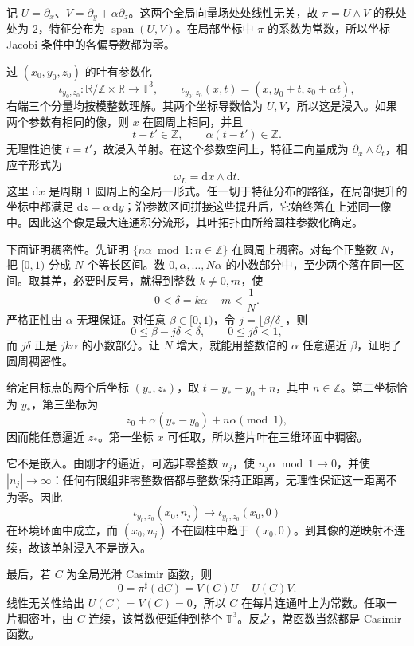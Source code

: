 \begin{solution}
	记 \(U=\partial_x\)、\(V=\partial_y+\alpha\partial_z\)。这两个全局向量场处处线性无关，故 \(\pi=U\wedge V\) 的秩处处为 \(2\)，特征分布为 \(\operatorname{span}(U,V)\)。在局部坐标中 \(\pi\) 的系数为常数，所以坐标 Jacobi 条件中的各偏导数都为零。

	过 \((x_0,y_0,z_0)\) 的叶有参数化
	\[
		\iota_{y_0,z_0}:\mathbb R/\mathbb Z\times\mathbb R\longrightarrow\mathbb T^3,
		\qquad
		\iota_{y_0,z_0}(x,t)=(x,y_0+t,z_0+\alpha t),
	\]
	右端三个分量均按模整数理解。其两个坐标导数恰为 \(U,V\)，所以这是浸入。如果两个参数有相同的像，则 \(x\) 在圆周上相同，并且
	\[
		t-t'\in\mathbb Z,\qquad \alpha(t-t')\in\mathbb Z.
	\]
	无理性迫使 \(t=t'\)，故浸入单射。在这个参数空间上，特征二向量成为 \(\partial_x\wedge\partial_t\)，相应辛形式为
	\[
		\omega_L=\mathrm{d}x\wedge\mathrm{d}t.
	\]
	这里 \(\mathrm{d}x\) 是周期 \(1\) 圆周上的全局一形式。任一切于特征分布的路径，在局部提升的坐标中都满足 \(\mathrm{d}z=\alpha\,\mathrm{d}y\)；沿参数区间拼接这些提升后，它始终落在上述同一像中。因此这个像是最大连通积分流形，其叶拓扑由所给圆柱参数化确定。

	下面证明稠密性。先证明 \(\{n\alpha\bmod1:n\in\mathbb Z\}\) 在圆周上稠密。对每个正整数 \(N\)，把 \([0,1)\) 分成 \(N\) 个等长区间。数 \(0,\alpha,\ldots,N\alpha\) 的小数部分中，至少两个落在同一区间。取其差，必要时反号，就得到整数 \(k\ne0,m\)，使
	\[
		0<\delta=k\alpha-m<\frac1N.
	\]
	严格正性由 \(\alpha\) 无理保证。对任意 \(\beta\in[0,1)\)，令 \(j=\lfloor\beta/\delta\rfloor\)，则
	\[
		0\le\beta-j\delta<\delta,\qquad 0\le j\delta<1,
	\]
	而 \(j\delta\) 正是 \(jk\alpha\) 的小数部分。让 \(N\) 增大，就能用整数倍的 \(\alpha\) 任意逼近 \(\beta\)，证明了圆周稠密性。

	给定目标点的两个后坐标 \((y_*,z_*)\)，取 \(t=y_*-y_0+n\)，其中 \(n\in\mathbb Z\)。第二坐标恰为 \(y_*\)，第三坐标为
	\[
		z_0+\alpha(y_*-y_0)+n\alpha\pmod1,
	\]
	因而能任意逼近 \(z_*\)。第一坐标 \(x\) 可任取，所以整片叶在三维环面中稠密。

	它不是嵌入。由刚才的逼近，可选非零整数 \(n_j\)，使 \(n_j\alpha\bmod1\to0\)，并使 \(|n_j|\to\infty\)：任何有限组非零整数倍都与整数保持正距离，无理性保证这一距离不为零。因此
	\[
		\iota_{y_0,z_0}(x_0,n_j)\longrightarrow
		\iota_{y_0,z_0}(x_0,0)
	\]
	在环境环面中成立，而 \((x_0,n_j)\) 不在圆柱中趋于 \((x_0,0)\)。到其像的逆映射不连续，故该单射浸入不是嵌入。

	最后，若 \(C\) 为全局光滑 Casimir 函数，则
	\[
		0=\pi^\sharp(\mathrm{d}C)=V(C)U-U(C)V.
	\]
	线性无关性给出 \(U(C)=V(C)=0\)，所以 \(C\) 在每片连通叶上为常数。任取一片稠密叶，由 \(C\) 连续，该常数便延伸到整个 \(\mathbb T^3\)。反之，常函数当然都是 Casimir 函数。
\end{solution}

